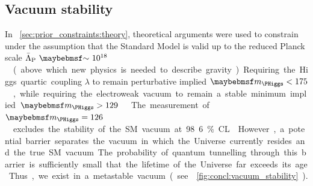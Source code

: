 \subsection{Vacuum stability}
\label{sec:implications:vacuum}

In \Section~\ref{sec:prior_constraints:theory}, theoretical arguments were used to 
constrain \mH under the assumption that the Standard Model is valid up to the reduced 
Planck scale \unit{$\bar{\Lambda}_{\text{P}}~\about~10^{18}$}{\GeV} (above which new 
physics is needed to describe gravity). Requiring the Higgs quartic coupling $\lambda$ to 
remain perturbative implied \unit{$\mH < 175$}{\GeV}, while requiring the electroweak 
vacuum to remain a stable minimum implied \unit{$\mH > 129$}{\GeV} \cite{Ellis:2009}. 

The measurement of \unit{$\mH = 126$}{\GeV} excludes the stability of the SM vacuum at 
98.6\% CL \cite{Degrassi:vacuum}. However, a potential barrier separates the vacuum in 
which the Universe currently resides and the true SM vacuum. The probability of quantum 
tunnelling through this barrier is sufficiently small that the lifetime of the Universe 
far exceeds its age. Thus, we exist in a metastable vacuum (see 
\Figure~\ref{fig:concl:vacuum_stability}).

